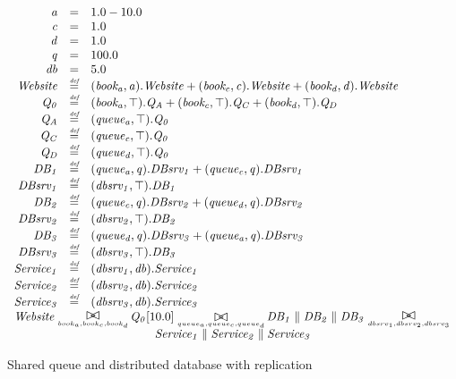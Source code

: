 \begin{figure}
	\caption{Shared queue and distributed database with replication}
	\label{figure:queueddrep}
	\centering
	\begin{displaymath}
	\begin{array}{rcl}
	\mathit{a} & = & 1.0-10.0\\
	\mathit{c} & = & 1.0\\
	\mathit{d} & = & 1.0\\
	\mathit{q} & = & 100.0\\
	\mathit{db} & = & 5.0\\
	[0.0ex]		\mathit{Website} & \rmdef & (\mathit{book_a},\mathit{a}).\mathit{Website}+(\mathit{book_c},\mathit{c}).\mathit{Website}+(\mathit{book_d},\mathit{d}).\mathit{Website}\\
	\mathit{Q_0} & \rmdef & (\mathit{book_a},\top).\mathit{Q_A}+(\mathit{book_c},\top).\mathit{Q_C}+(\mathit{book_d},\top).\mathit{Q_D}\\
	\mathit{Q_A} & \rmdef & (\mathit{queue_a},\top).\mathit{Q_0}\\
	\mathit{Q_C} & \rmdef & (\mathit{queue_c},\top).\mathit{Q_0}\\
	\mathit{Q_D} & \rmdef & (\mathit{queue_d},\top).\mathit{Q_0}\\
	\mathit{DB_1} & \rmdef & (\mathit{queue_a},\mathit{q}).\mathit{DBsrv_1}+(\mathit{queue_c},\mathit{q}).\mathit{DBsrv_1}\\
	\mathit{DBsrv_1} & \rmdef & (\mathit{dbsrv_1},\top).\mathit{DB_1}\\
	\mathit{DB_2} & \rmdef & (\mathit{queue_c},\mathit{q}).\mathit{DBsrv_2}+(\mathit{queue_d},\mathit{q}).\mathit{DBsrv_2}\\
	\mathit{DBsrv_2} & \rmdef & (\mathit{dbsrv_2},\top).\mathit{DB_2}\\
	\mathit{DB_3} & \rmdef & (\mathit{queue_d},\mathit{q}).\mathit{DBsrv_3}+(\mathit{queue_a},\mathit{q}).\mathit{DBsrv_3}\\
	\mathit{DBsrv_3} & \rmdef & (\mathit{dbsrv_3},\top).\mathit{DB_3}\\
	\mathit{Service_1} & \rmdef & (\mathit{dbsrv_1},\mathit{db}).\mathit{Service_1}\\
	\mathit{Service_2} & \rmdef & (\mathit{dbsrv_2},\mathit{db}).\mathit{Service_2}\\
	\mathit{Service_3} & \rmdef & (\mathit{dbsrv_3},\mathit{db}).\mathit{Service_3}\\
	[0.0ex]		\multicolumn{3}{c}{\mathit{Website}\sync{book_a,book_c,book_d}\mathit{Q_0}[10.0]\sync{queue_a,queue_c,queue_d}\mathit{DB_1}\parallel\mathit{DB_2}\parallel\mathit{DB_3}\sync{dbsrv_1,dbsrv_2,dbsrv_3}}\\
	\multicolumn{3}{c}{\mathit{Service_1}\parallel\mathit{Service_2}\parallel\mathit{Service_3}}\\
	[0.0ex]	\end{array}
	\end{displaymath}
\end{figure}

